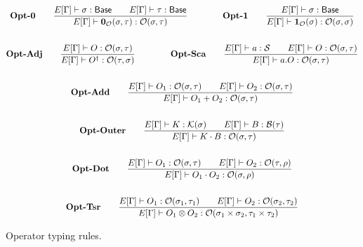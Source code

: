 \documentclass{article}
\begin{document}
\begin{figure}[h]
    \begin{gather*}
        \textbf{Opt-0} \qquad
        \frac{E[\Gamma] \vdash \sigma : \mathsf{Base} \qquad E[\Gamma] \vdash \tau : \mathsf{Base}}{E[\Gamma] \vdash \mathbf{0}_\mathcal{O}(\sigma, \tau) : \mathcal{O}(\sigma, \tau)} 
        \qquad \qquad
        \textbf{Opt-1} \qquad
        \frac{E[\Gamma] \vdash \sigma : \mathsf{Base}}{E[\Gamma] \vdash \mathbf{1}_\mathcal{O}(\sigma) : \mathcal{O}(\sigma, \sigma)} \\
        \\
        \textbf{Opt-Adj} \qquad
        \frac{E[\Gamma] \vdash O : \mathcal{O}(\sigma, \tau)}{E[\Gamma] \vdash O^\dagger : \mathcal{O}(\tau, \sigma)} 
        \qquad \qquad
        \textbf{Opt-Sca} \qquad
        \frac{E[\Gamma] \vdash a : \mathcal{S} \qquad E[\Gamma] \vdash O : \mathcal{O}(\sigma, \tau)}{E[\Gamma] \vdash a.O : \mathcal{O}(\sigma, \tau)} \\
        \\
        \textbf{Opt-Add} \qquad
        \frac{E[\Gamma] \vdash O_1 : \mathcal{O}(\sigma, \tau) \qquad E[\Gamma] \vdash O_2 : \mathcal{O}(\sigma, \tau)}{E[\Gamma] \vdash O_1 + O_2 : \mathcal{O}(\sigma, \tau)} \\
        \\
        \textbf{Opt-Outer} \qquad
        \frac{E[\Gamma]\vdash K : \mathcal{K}(\sigma) \qquad E[\Gamma]\vdash B : \mathcal{B}(\tau)}{E[\Gamma]\vdash K \cdot B : \mathcal{O}(\sigma, \tau)} \\
        \\
        \textbf{Opt-Dot} \qquad
        \frac{E[\Gamma] \vdash O_1 : \mathcal{O}(\sigma, \tau) \qquad E[\Gamma] \vdash O_2 : \mathcal{O}(\tau, \rho)}{E[\Gamma] \vdash O_1 \cdot O_2 : \mathcal{O}(\sigma, \rho)} \\
        \\
        \textbf{Opt-Tsr} \qquad
        \frac{E[\Gamma] \vdash O_1 : \mathcal{O}(\sigma_1, \tau_1) \qquad E[\Gamma] \vdash O_2 : \mathcal{O}(\sigma_2, \tau_2)} {E[\Gamma] \vdash O_1 \otimes O_2 : \mathcal{O}(\sigma_1 \times \sigma_2, \tau_1 \times \tau_2)}
    \end{gather*}
    \caption{Operator typing rules.}
\end{figure}

\clearpage
\end{document}
